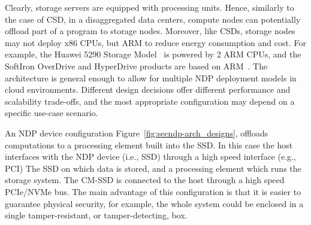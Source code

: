 
Clearly, storage servers are equipped with processing units. Hence, similarly to the case of CSD, in a disaggregated data centers, compute nodes %
can potentially offload part of a program to storage nodes.
Moreover, like CSDs, storage nodes may not deploy x86 CPUs, but ARM to reduce energy consumption and cost.
For example, the Huawei 5290 Storage Model~\cite{huaweiStorage} is powered by 2 ARM CPUs, and the SoftIron OverDrive and HyperDrive products are based on ARM~\cite{softiron,softironDS,softironDSH}. 
\fi
{} %
The \project{} architecture is general enough to allow for multiple NDP deployment models in cloud environments.
Different design decisions offer different performance and scalability trade-offs, and the most appropriate configuration may depend on a specific use-case scenario.



An NDP device configuration Figure~\ref{fig:secndp-arch_designs}, offloads computations to a processing element built into the SSD.
In this case the host interfaces with the NDP device (i.e., SSD) through a high speed interface (e.g., PCI) 
The SSD  on which data is stored, and a processing element which runs the storage system.
The CM-SSD is connected to the host through a high speed PCIe/NVMe bus.
The main advantage of this configuration is that it is easier to guarantee physical security, for example, the whole system could be enclosed in a single tamper-resistant, or tamper-detecting, box.

